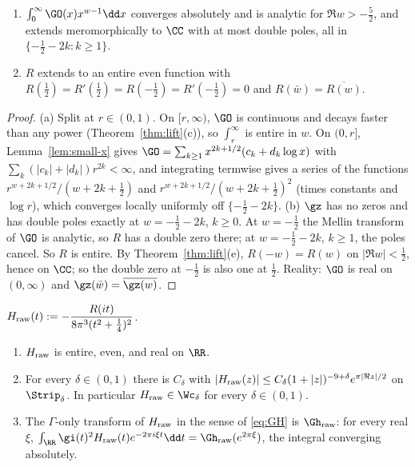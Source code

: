 \begin{lemma}\label{lem:R-entire}
\begin{enumerate}[label=\textup{(\alph*)}]
\item $\int_0^\infty\GO(x)x^{w-1}\dd x$ converges absolutely and is analytic for $\Re w>-\frac52$, and extends meromorphically to $\CC$ with at
most double poles, all in $\{-\frac12-2k:k\ge1\}$.
\item $R$ extends to an entire even function with $R(\frac12)=R'(\frac12)=R(-\frac12)=R'(-\frac12)=0$ and $R(\bar w)=\overline{R(w)}$.
\end{enumerate}
\end{lemma}

\begin{proof}
(a) Split at $r\in(0,1)$. On $[r,\infty)$, $\GO$ is continuous and decays faster than any power (Theorem~\ref{thm:lift}(c)), so
$\int_r^\infty$ is entire in $w$. On $(0,r]$, Lemma~\ref{lem:small-x} gives $\GO=\sum_{k\ge1}x^{2k+1/2}(c_k+d_k\log x)$ with
$\sum_k(|c_k|+|d_k|)r^{2k}<\infty$, and integrating termwise gives a series of the functions $r^{w+2k+1/2}/(w+2k+\frac12)$ and
$r^{w+2k+1/2}/(w+2k+\frac12)^2$ (times constants and $\log r$), which converges locally uniformly off $\{-\frac12-2k\}$. (b) $\gz$ has no zeros
and has double poles exactly at $w=-\frac12-2k$, $k\ge0$. At $w=-\frac12$ the Mellin transform of $\GO$ is analytic, so $R$ has a double zero
there; at $w=-\frac12-2k$, $k\ge1$, the poles cancel. So $R$ is entire. By Theorem~\ref{thm:lift}(e), $R(-w)=R(w)$ on $|\Re w|<\frac12$, hence on
$\CC$; so the double zero at $-\frac12$ is also one at $\frac12$. Reality: $\GO$ is real on $(0,\infty)$ and $\gz(\bar w)=\overline{\gz(w)}$.
\end{proof}

\begin{definition}\label{def:Hraw}
$H_{\rm raw}(t):=-\dfrac{R(it)}{8\pi^3(t^2+\frac14)^2}$.
\end{definition}

\begin{proposition}\label{prop:Hraw}
\begin{enumerate}[label=\textup{(\alph*)}]
\item $H_{\rm raw}$ is entire, even, and real on $\RR$.
\item For every $\delta\in(0,1)$ there is $C_\delta$ with $|H_{\rm raw}(z)|\le C_\delta(1+|z|)^{-9+\delta}e^{\pi|\Re z|/2}$ on $\Strip_\delta$. In
particular $H_{\rm raw}\in\Wc_\delta$ for every $\delta\in(0,1)$.
\item The $\Gamma$-only transform of $H_{\rm raw}$ in the sense of \eqref{eq:GH} is $\Gh_{\rm raw}$: for every real $\xi$,
$\int_\RR\gi(t)^2H_{\rm raw}(t)e^{-2\pi i\xi t}\dd t=\Gh_{\rm raw}(e^{2\pi\xi})$, the integral converging absolutely.
\end{enumerate}
\end{proposition}

